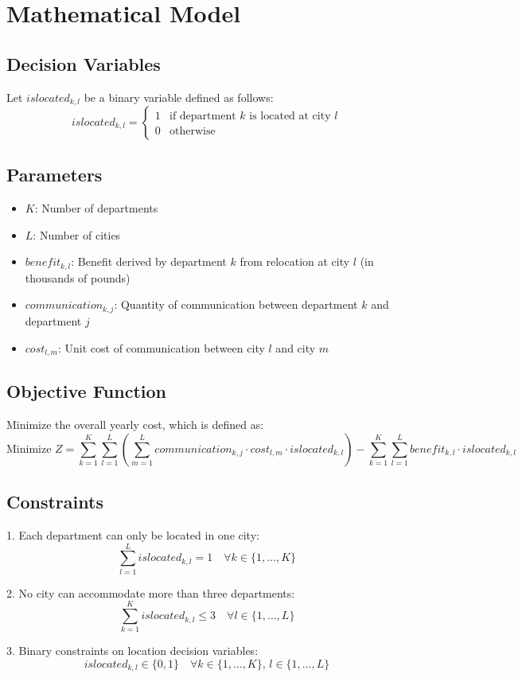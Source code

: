 \documentclass{article}
\begin{document}
\section*{Mathematical Model}

\subsection*{Decision Variables}
Let \( islocated_{k,l} \) be a binary variable defined as follows:
\[
islocated_{k,l} =
\begin{cases}
1 & \text{if department } k \text{ is located at city } l \\
0 & \text{otherwise}
\end{cases}
\]

\subsection*{Parameters}
\begin{itemize}
    \item \( K \): Number of departments
    \item \( L \): Number of cities
    \item \( benefit_{k,l} \): Benefit derived by department \( k \) from relocation at city \( l \) (in thousands of pounds)
    \item \( communication_{k,j} \): Quantity of communication between department \( k \) and department \( j \)
    \item \( cost_{l,m} \): Unit cost of communication between city \( l \) and city \( m \)
\end{itemize}

\subsection*{Objective Function}
Minimize the overall yearly cost, which is defined as:
\[
\text{Minimize } Z = \sum_{k=1}^{K} \sum_{l=1}^{L} \left( \sum_{m=1}^{L} communication_{k,j} \cdot cost_{l,m} \cdot islocated_{k,l} \right) - \sum_{k=1}^{K} \sum_{l=1}^{L} benefit_{k,l} \cdot islocated_{k,l}
\]

\subsection*{Constraints}
1. Each department can only be located in one city:
\[
\sum_{l=1}^{L} islocated_{k,l} = 1 \quad \forall k \in \{1, \ldots, K\}
\]

2. No city can accommodate more than three departments:
\[
\sum_{k=1}^{K} islocated_{k,l} \leq 3 \quad \forall l \in \{1, \ldots, L\}
\]

3. Binary constraints on location decision variables:
\[
islocated_{k,l} \in \{0, 1\} \quad \forall k \in \{1, \ldots, K\}, \, l \in \{1, \ldots, L\}
\]
\end{document}
